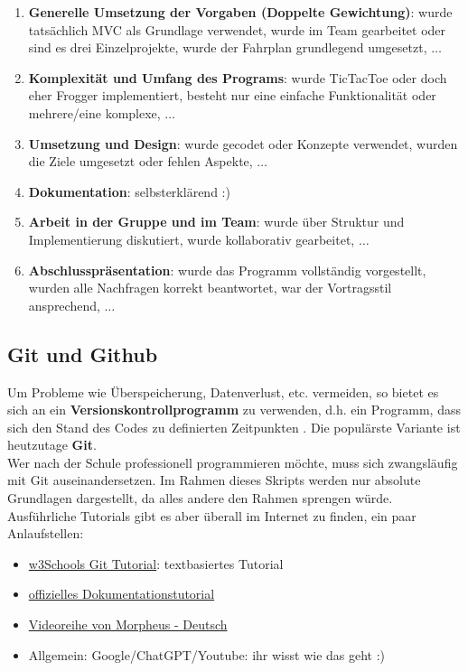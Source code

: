 \documentclass{article}
\begin{document}
\begin{enumerate}
    \item \textbf{Generelle Umsetzung der Vorgaben (Doppelte Gewichtung)}: wurde tatsächlich MVC als Grundlage verwendet, wurde im Team gearbeitet oder sind es drei Einzelprojekte, wurde der Fahrplan grundlegend umgesetzt, $\dots$
    \item \textbf{Komplexität und Umfang des Programs}: wurde TicTacToe oder doch eher Frogger implementiert, besteht nur eine einfache Funktionalität oder mehrere/eine komplexe, $\dots$
    \item \textbf{Umsetzung und Design}: wurde  gecodet oder Konzepte verwendet, wurden die Ziele umgesetzt oder fehlen Aspekte, $\dots$
    \item \textbf{Dokumentation}: selbsterklärend :)
    \item \textbf{Arbeit in der Gruppe und im Team}: wurde über Struktur und Implementierung diskutiert, wurde kollaborativ gearbeitet, $\dots$
    \item \textbf{Abschlusspräsentation}: wurde das Programm vollständig vorgestellt, wurden alle Nachfragen korrekt beantwortet, war der Vortragsstil ansprechend, $\dots$
\end{enumerate}



\subsection{Git und Github}
\label{sec:git}

Um Probleme wie Überspeicherung, Datenverlust, etc. vermeiden, so bietet es sich an ein \textbf{Versionskontrollprogramm} zu verwenden, d.h. ein Programm, dass sich den Stand des Codes zu definierten Zeitpunkten . Die populärste Variante ist heutzutage \textbf{Git}. \\
Wer nach der Schule professionell programmieren möchte, muss sich zwangsläufig mit Git auseinandersetzen. Im Rahmen dieses Skripts werden nur absolute Grundlagen dargestellt, da alles andere den Rahmen sprengen würde. Ausführliche Tutorials gibt es aber überall im Internet zu finden, ein paar Anlaufstellen:
\begin{itemize}
    \item \href{https://www.w3schools.com/git/git_intro.asp?remote=github}{w3Schools Git Tutorial}: textbasiertes Tutorial
    \item \href{https://git-scm.com/docs/gittutorial}{offizielles Dokumentationstutorial}
    \item \href{https://www.youtube.com/playlist?list=PLNmsVeXQZj7rbmmqb1Lt_RGU4DEhelTrR}{Videoreihe von Morpheus - Deutsch}
    \item Allgemein: Google/ChatGPT/Youtube: ihr wisst wie das geht :)
\end{itemize}
\end{document}
